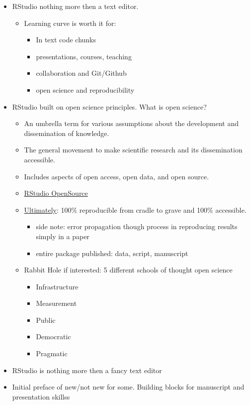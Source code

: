 \documentclass[
  letterpaper,
  DIV=11,
  numbers=noendperiod]{scrartcl}
\providecommand{\tightlist}{%
  \setlength{\itemsep}{0pt}\setlength{\parskip}{0pt}}\usepackage{longtable,booktabs,array}
\begin{document}
\begin{itemize}
\tightlist
\item
  RStudio nothing more then a text editor.

  \begin{itemize}
  \tightlist
  \item
    Learning curve is worth it for:

    \begin{itemize}
    \tightlist
    \item
      In text code chunks
    \item
      presentations, courses, teaching
    \item
      collaboration and Git/Github
    \item
      open science and reproducibility
    \end{itemize}
  \end{itemize}
\item
  RStudio built on open science principles. What is open science?

  \begin{itemize}
  \tightlist
  \item
    An umbrella term for various assumptions about the development and
    dissemination of knowledge.
  \item
    The general movement to make scientific research and its
    dissemination accessible.
  \item
    Includes aspects of open access, open data, and open source.
  \item
    \href{https://posit.co/products/open-source/}{RStudio OpenSource}
  \item
    \ul{Ultimately}: 100\% reproducible from cradle to grave and 100\%
    accessible.

    \begin{itemize}
    \tightlist
    \item
      side note: error propagation though process in reproducing results
      simply in a paper
    \item
      entire package published: data, script, manuscript
    \end{itemize}
  \item
    Rabbit Hole if interested: 5 different schools of thought open
    science

    \begin{itemize}
    \tightlist
    \item
      Infrastructure
    \item
      Measurement
    \item
      Public
    \item
      Democratic
    \item
      Pragmatic
    \end{itemize}
  \end{itemize}
\item
  RStudio is nothing more then a fancy text editor
\item
  Initial preface of new/not new for some. Building blocks for
  manuscript and presentation skillss
\end{itemize}
\end{document}
